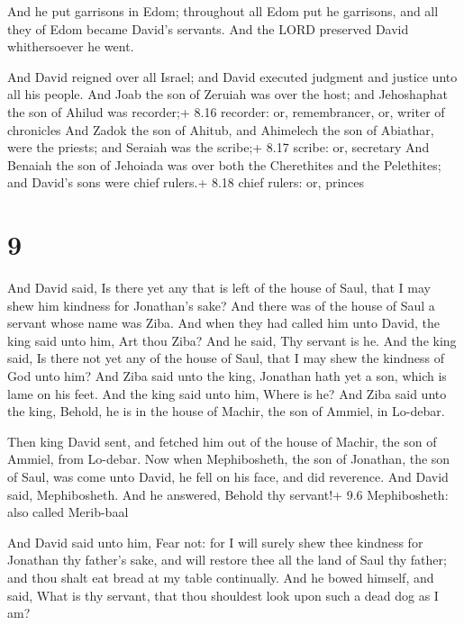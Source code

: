  And he put garrisons in Edom; throughout all Edom put he
garrisons, and all they of Edom became David's servants. And the LORD
preserved David whithersoever he went.

 And David reigned over all Israel; and David executed
judgment and justice unto all his people.  And Joab the son
of Zeruiah was over the host; and Jehoshaphat the son of Ahilud was
recorder;+ 8.16 recorder: or, remembrancer, or, writer of chronicles
 And Zadok the son of Ahitub, and Ahimelech the son of
Abiathar, were the priests; and Seraiah was the scribe;+ 8.17 scribe:
or, secretary  And Benaiah the son of Jehoiada was over
both the Cherethites and the Pelethites; and David's sons were chief
rulers.+ 8.18 chief rulers: or, princes

\hypertarget{section-8}{%
\section{9}\label{section-8}}

 And David said, Is there yet any that is left of the house
of Saul, that I may shew him kindness for Jonathan's sake? 
And there was of the house of Saul a servant whose name was Ziba. And
when they had called him unto David, the king said unto him, Art thou
Ziba? And he said, Thy servant is he.  And the king said, Is
there not yet any of the house of Saul, that I may shew the kindness of
God unto him? And Ziba said unto the king, Jonathan hath yet a son,
which is lame on his feet.  And the king said unto him,
Where is he? And Ziba said unto the king, Behold, he is in the house of
Machir, the son of Ammiel, in Lo-debar.

 Then king David sent, and fetched him out of the house of
Machir, the son of Ammiel, from Lo-debar.  Now when
Mephibosheth, the son of Jonathan, the son of Saul, was come unto David,
he fell on his face, and did reverence. And David said, Mephibosheth.
And he answered, Behold thy servant!+ 9.6 Mephibosheth: also called
Merib-baal

 And David said unto him, Fear not: for I will surely shew
thee kindness for Jonathan thy father's sake, and will restore thee all
the land of Saul thy father; and thou shalt eat bread at my table
continually.  And he bowed himself, and said, What is thy
servant, that thou shouldest look upon such a dead dog as I am?

